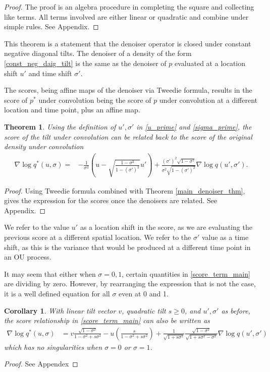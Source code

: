 \documentclass[11pt]{article}
\theoremstyle{proposition}
\theoremstyle{lemma}
\theoremstyle{corollary}
\newtheorem{corollary}{Corollary}
\theoremstyle{theorem}
\newtheorem{theorem}{Theorem}
\theoremstyle{definition}
\begin{document}
\begin{proof}
The proof is an algebra procedure in completing the square and collecting like terms. All terms involved are either linear or quadratic and combine under simple rules. See Appendix.
\end{proof}
This theorem is a statement that the denoiser operator is closed under constant negative diagonal tilts. The denoiser of a density of the form  \eqref{const_neg_daig_tilt} is the same as the denoiser of $p$ evaluated at a location shift $u'$ and time shift $\sigma'$.


The scores, being affine maps of the denoiser via Tweedie formula, results in the score of $p^{*}$ under convolution being the score of $p$ under convolution at a different location and time point, plus an affine map.
\begin{theorem}\label{score_thm}
Using the definition of $u', \sigma'$ in \eqref{u_prime} and \eqref{sigma_prime}, the score of the tilt under convolution can be related back to the score of the original density under convolution
\begin{align}
\nabla \log q^{*}(u,  \sigma)=&-\frac{1}{\sigma^{2}}(u- \sqrt{\frac{1-\sigma^{2}}{1-(\sigma')^{2}}}u')+\frac{(\sigma')^{2}\sqrt{1-\sigma^{2}}}{\sigma^{2}\sqrt{1-(\sigma')^{2}}}\nabla \log q(u', \sigma').\label{score_term_main}
\end{align}
\end{theorem}
\begin{proof}
Using Tweedie formula combined with Theorem \ref{main_denoiser_thm}, gives the expression for the scores once the denoisers are related. See Appendix.
\end{proof}
We refer to the value $u'$ as a location shift in the score, as we are evaluating the previous score at a different spatial location. We refer to the $\sigma'$ value as a time shift, as this is the variance that would be produced at a different time point in an OU process.

It may seem that either when $\sigma = 0,1$, certain quantities in \eqref{score_term_main} are dividing by zero. However, by rearranging the expression that is not the case, it is a well defined equation for all $\sigma$ even at 0 and 1.
\begin{corollary}\label{clean_form}
    With linear tilt vector $v$, quadratic tilt $s \geq 0$, and $u',\sigma'$ as before, the score relationship in \eqref{score_term_main} can also be written as
    \begin{align}
        \nabla \log q^{*}(u,\sigma)&=  v \frac{\sqrt{1-\sigma^{2}}}{1-\sigma^{2}+s\sigma^{2}}-u (\frac{s}{1-\sigma^{2}+s \sigma^{2}})+\frac{1}{\sqrt{1+s \sigma^{2}}}\frac{\sqrt{1-\sigma^{2}}}{\sqrt{1+s \sigma^{2}-\sigma^{2}}}\nabla \log q(u',\sigma')
    \end{align}
    which has no singularities when $\sigma = 0$ or $\sigma = 1$.
\end{corollary}
\begin{proof}
    See Appendex
\end{proof}
\end{document}

